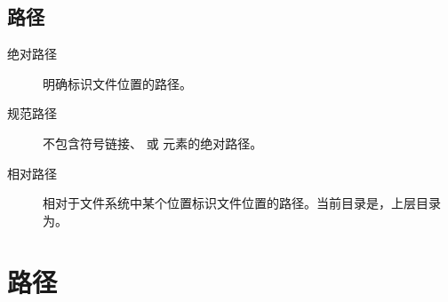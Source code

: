 \subsection{路径}
\begin{description}
	\item[\faRoad 绝对路径]明确标识文件位置的路径。
	\item[\faRoad 规范路径]不包含符号链接、 或  元素的绝对路径。
	\item[\faRoad 相对路径]相对于文件系统中某个位置标识文件位置的路径。当前目录是，上层目录为。
\end{description}

\section{路径}
